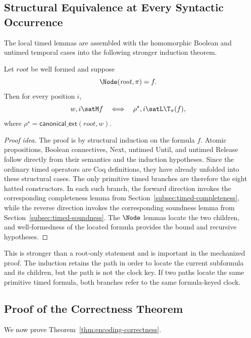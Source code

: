 \subsection{Structural Equivalence at Every Syntactic Occurrence}

The local timed lemmas are assembled with the homomorphic Boolean and untimed temporal
cases into the following stronger induction theorem.

\begin{theorem}
\label{thm:canonical-all}
Let $\mathit{root}$ be well formed and suppose
\[
  \Node(\mathit{root},\pi)=f.
\]
Then for every position $i$,
\[
  w,i\satM f
  \quad\Longleftrightarrow\quad
  \rho^\star,i\satL\T_\pi(f),
\]
where $\rho^\star=\mathsf{canonical\_ext}(\mathit{root},w)$.
\end{theorem}

\begin{proof}[Proof idea]
The proof is by structural induction on the formula $f$.  Atomic propositions,
Boolean connectives, Next, untimed Until, and untimed Release follow directly
from their semantics and the induction hypotheses.  Since the ordinary timed
operators are Coq definitions, they have already unfolded into these structural
cases.  The only primitive timed branches are therefore the eight hatted
constructors.  In each such branch, the forward direction invokes the
corresponding completeness lemma from
Section~\ref{subsec:timed-completeness}, while the reverse direction invokes
the corresponding soundness lemma from
Section~\ref{subsec:timed-soundness}.  The $\Node$ lemmas locate the two
children, and well-formedness of the located formula provides the bound and
recursive hypotheses.
\end{proof}

This is stronger than a root-only statement and is important in the mechanized
proof.  The induction retains the path in order to locate the current subformula
and its children, but the path is not the clock key.  If two paths locate the
same primitive timed formula, both branches refer to the same formula-keyed
clock.

\subsection{Proof of the Correctness Theorem}
\label{subsec:proof-main-theorem}
We now prove Theorem~\ref{thm:encoding-correctness}.

